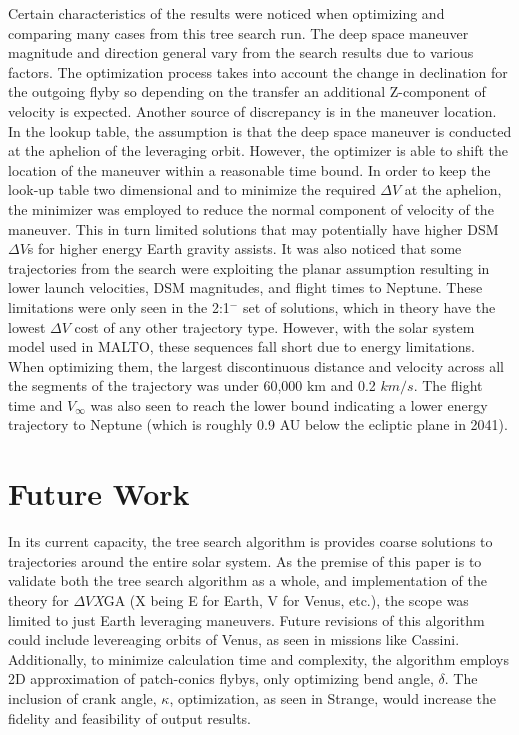 \documentclass[letterpaper, preprint, paper,11pt]{AAS}	%
\begin{document}
Certain characteristics of the results were noticed when optimizing and comparing many cases from this tree search run. The deep space maneuver magnitude and direction general vary from the search results due to various factors. The optimization process takes into account the change in declination for the outgoing flyby so depending on the transfer an additional Z-component of velocity is expected. Another source of discrepancy is in the maneuver location. In the lookup table, the assumption is that the deep space maneuver is conducted at the aphelion of the leveraging orbit. However, the optimizer is able to shift the location of the maneuver within a reasonable time bound. In order to keep the look-up table two dimensional and to minimize the required $\Delta V$ at the aphelion, the minimizer was employed to reduce the normal component of velocity of the maneuver. This in turn limited solutions that may potentially have higher DSM $\Delta V$s for higher energy Earth gravity assists. It was also noticed that some trajectories from the search were exploiting the planar assumption resulting in lower launch velocities, DSM magnitudes, and flight times to Neptune. These limitations were only seen in the 2:1$^{-}$ set of solutions, which in theory have the lowest $\Delta V$ cost of any other trajectory type. However, with the solar system model used in MALTO, these sequences fall short due to energy limitations. When optimizing them, the largest discontinuous distance and velocity across all the segments of the trajectory was under 60,000 km and 0.2 $km/s$. The flight time and $V_\infty$ was also seen to reach the lower bound indicating a lower energy trajectory to Neptune (which is roughly 0.9 AU below the ecliptic plane in 2041).

\section{Future Work}

In its current capacity, the tree search algorithm is provides coarse solutions to trajectories around the entire solar system. As the premise of this paper is to validate both the tree search algorithm as a whole, and implementation of the theory for $\Delta V$\textit{X}GA (X being E for Earth, V for Venus, etc.), the scope was limited to just Earth leveraging maneuvers. Future revisions of this algorithm could include levereaging orbits of Venus, as seen in missions like Cassini. Additionally, to minimize calculation time and complexity, the algorithm employs 2D approximation of patch-conics flybys, only optimizing bend angle, $\delta$. The inclusion of crank angle, $\kappa$, optimization, as seen in Strange\cite{Strange2008}, would increase the fidelity and feasibility of output results.
\end{document}
